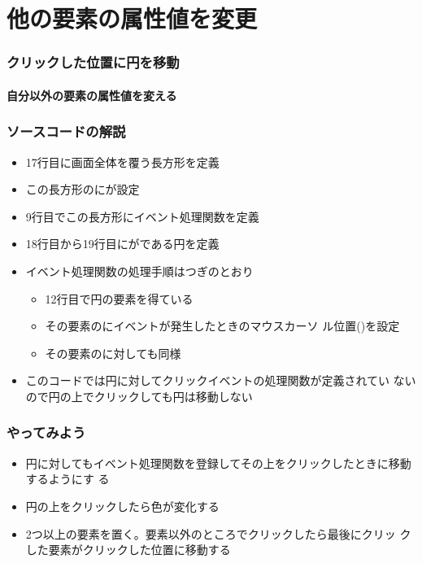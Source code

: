 

\frame{\maketitle}
\section{他の要素の属性値を変更}
\begin{frame}[containsverbatim]
 \frametitle{クリックした位置に円を移動}
 \framesubtitle{自分以外の要素の属性値を変える}
\end{frame}
\begin{frame}[containsverbatim]
 \frametitle{ソースコードの解説}
 \begin{itemize}
  \item 17行目に画面全体を覆う長方形を定義
  \item この長方形のにが設定
  \item 9行目でこの長方形にイベント処理関数を定義
  \item 18行目から19行目にがである円を定義
  \item イベント処理関数の処理手順はつぎのとおり
        \begin{itemize}
         \item 12行目で円の要素を得ている
         \item その要素のにイベントが発生したときのマウスカーソ
               ル位置()を設定
         \item その要素のに対しても同様
        \end{itemize}
  \item このコードでは円に対してクリックイベントの処理関数が定義されてい
        ないので円の上でクリックしても円は移動しない
 \end{itemize}
\end{frame}
\begin{frame}[containsverbatim]
 \frametitle{やってみよう}
 \begin{itemize}
  \item 円に対してもイベント処理関数を登録してその上をクリックしたときに移動するようにす
        る
  \item 円の上をクリックしたら色が変化する
  \item 2つ以上の要素を置く。要素以外のところでクリックしたら最後にクリッ
        クした要素がクリックした位置に移動する
 \end{itemize}
\end{frame}
